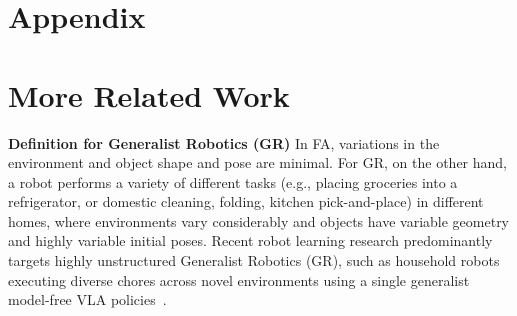 \clearpage

\appendix

\section*{Appendix}


\startcontents[appendix]


\clearpage

\setcounter{figure}{0}          %


\section{More Related Work}

\textbf{Definition for Generalist Robotics (GR)}
In FA, variations in the environment and object shape and pose are minimal. For GR, on the other hand, a robot performs a variety of different tasks (e.g., placing groceries into a refrigerator, or 
domestic cleaning, folding, kitchen pick-and-place) in different homes, where environments vary considerably and objects have variable geometry and highly variable initial poses. Recent robot learning research predominantly targets highly unstructured Generalist Robotics (GR), such as household robots executing diverse chores across novel environments using a single generalist model-free VLA policies~\cite{levine2016end, chi2025diffusion, kim24openvla, pi0_2024, black2025pi_}.


